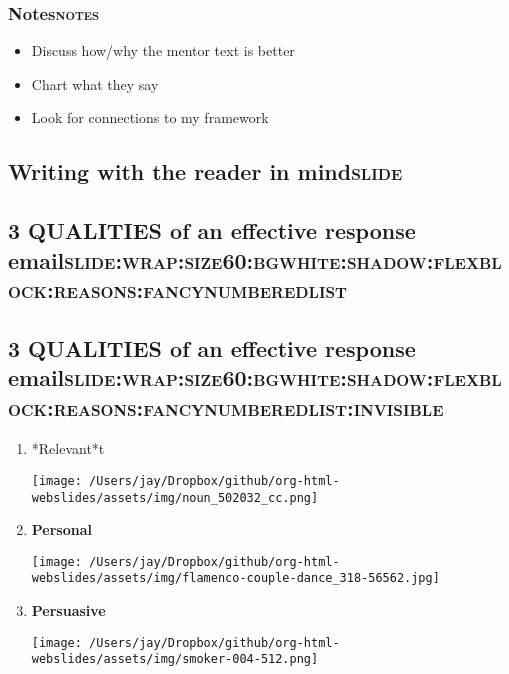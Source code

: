 \documentclass[12pt]{article}
\begin{document}
\subsubsection[Notes]{Notes\hfill{}\textsc{notes}}
\label{sec:org43f8315}
\begin{itemize}
\item Discuss how/why the mentor text is better
\item Chart what they say
\item Look for connections to my framework
\end{itemize}

\subsection[Writing with the reader in mind]{Writing with the reader in mind\hfill{}\textsc{slide}}
\label{sec:org6fdf9e5}

\subsection[\textbf{3 QUALITIES} of an effective response email]{\textbf{3 QUALITIES} of an effective response email\hfill{}\textsc{slide:wrap:size60:bgwhite:shadow:flexblock:reasons:fancynumberedlist}}
\label{sec:org5920881}

\subsection[\textbf{3 QUALITIES} of an effective response email]{\textbf{3 QUALITIES} of an effective response email\hfill{}\textsc{slide:wrap:size60:bgwhite:shadow:flexblock:reasons:fancynumberedlist:invisible}}
\label{sec:org4bdefa7}
\begin{enumerate}
\item *Relevant*t \begin{center}
\texttt{[image: /Users/jay/Dropbox/github/org-html-webslides/assets/img/noun\_502032\_cc.png]}
\end{center}
\item \textbf{Personal} \begin{center}
\texttt{[image: /Users/jay/Dropbox/github/org-html-webslides/assets/img/flamenco-couple-dance\_318-56562.jpg]}
\end{center}
\item \textbf{Persuasive} \begin{center}
\texttt{[image: /Users/jay/Dropbox/github/org-html-webslides/assets/img/smoker-004-512.png]}
\end{center}
\end{enumerate}
\end{document}
